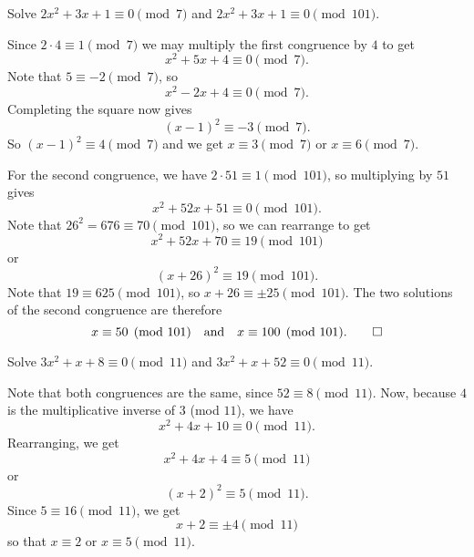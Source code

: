  Solve $2x^2 + 3x + 1\equiv0\pmod7$ and
$2x^2 + 3x + 1\equiv0\pmod{101}$.
\begin{solution}
  Since $2\cdot4\equiv1\pmod7$ we may multiply the first congruence by
  $4$ to get
  \begin{equation*}
    x^2 + 5x + 4\equiv0\pmod7.
  \end{equation*}
  Note that $5\equiv-2\pmod7$, so
  \begin{equation*}
    x^2 - 2x + 4\equiv0\pmod7.
  \end{equation*}
  Completing the square now gives
  \begin{equation*}
    (x - 1)^2\equiv-3\pmod7.
  \end{equation*}
  So $(x-1)^2\equiv4\pmod7$ and we get $x\equiv3\pmod7$ or
  $x\equiv6\pmod7$.

  For the second congruence, we have $2\cdot51\equiv1\pmod{101}$, so
  multiplying by $51$ gives
  \begin{equation*}
    x^2 + 52x + 51\equiv0\pmod{101}.
  \end{equation*}
  Note that $26^2 = 676\equiv70\pmod{101}$, so we can rearrange to get
  \begin{equation*}
    x^2 + 52x + 70 \equiv 19\pmod{101}
  \end{equation*}
  or
  \begin{equation*}
    (x + 26)^2\equiv19\pmod{101}.
  \end{equation*}
  Note that $19\equiv625\pmod{101}$, so $x +
  26\equiv\pm25\pmod{101}$. The two solutions of the second congruence
  are therefore
  \begin{equation*}
    x\equiv50\pmod{101}
    \quad\text{and}\quad
    x\equiv100\pmod{101}. \qedhere
  \end{equation*}
\end{solution}

 Solve $3x^2 + x + 8\equiv0\pmod{11}$ and
$3x^2 + x + 52\equiv0\pmod{11}$.
\begin{solution}
  Note that both congruences are the same, since
  $52\equiv8\pmod{11}$. Now, because $4$ is the multiplicative inverse
  of $3$ (mod $11$), we have
  \begin{equation*}
    x^2 + 4x + 10 \equiv 0\pmod{11}.
  \end{equation*}
  Rearranging, we get
  \begin{equation*}
    x^2 + 4x + 4 \equiv5\pmod{11}
  \end{equation*}
  or
  \begin{equation*}
    (x + 2)^2 \equiv 5\pmod{11}.
  \end{equation*}
  Since $5\equiv16\pmod{11}$, we get
  \begin{equation*}
    x + 2 \equiv \pm4\pmod{11}
  \end{equation*}
  so that $x\equiv2$ or $x\equiv5\pmod{11}$.
\end{solution}

